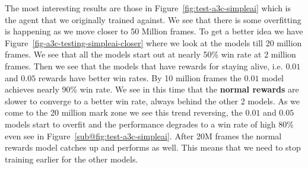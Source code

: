 \medskip
\noindent
The most interesting results are those in Figure~\ref{fig:test-a3c-simpleai} which is the agent that we originally trained against. We see that there is some overfitting is happening as we move closer to 50 Million frames. To get a better idea we have Figure~\ref{fig-a3c-testing-simpleai-closer} where we look at the models till 20 million frames. We see that all the models start out at nearly 50\% win rate at 2 million frames. Then we see that the models that have rewards for staying alive, i.e. $0.01$ and $0.05$ rewards have better win rates. By 10 million frames the $0.01$ model achieves nearly 90\% win rate. We see in this time that the \textbf{normal rewards} are slower to converge to a better win rate, always behind the other 2 models. As we come to the 20 million mark zone we see this trend reversing, the $0.01$ and $0.05$ models start to overfit and the performance degrades to a win rate of high 80\% even see in Figure~\ref{sub@fig:test-a3c-simpleai}. After 20M frames the normal rewards model catches up and performs as well. This means that we need to stop training earlier for the other models.

